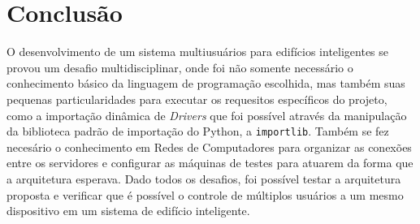 \chapter{Conclusão}
\label{conclusao}

O desenvolvimento de um sistema multiusuários para edifícios inteligentes se provou um desafio multidisciplinar,
onde foi não somente necessário o conhecimento básico da linguagem de programação escolhida, mas também suas pequenas
particularidades para executar os requesitos específicos do projeto, como a importação dinâmica de \emph{Drivers} que foi
possível através da manipulação da biblioteca padrão de importação do Python, a \lstinline{importlib}. Também se fez
necesário o conhecimento em Redes de Computadores para organizar as conexões entre os servidores e configurar as máquinas de testes
para atuarem da forma que a arquitetura esperava.
Dado todos os desafios, foi possível testar a arquitetura proposta e verificar que é possível o controle de múltiplos usuários
a um mesmo dispositivo em um sistema de edifício inteligente.
